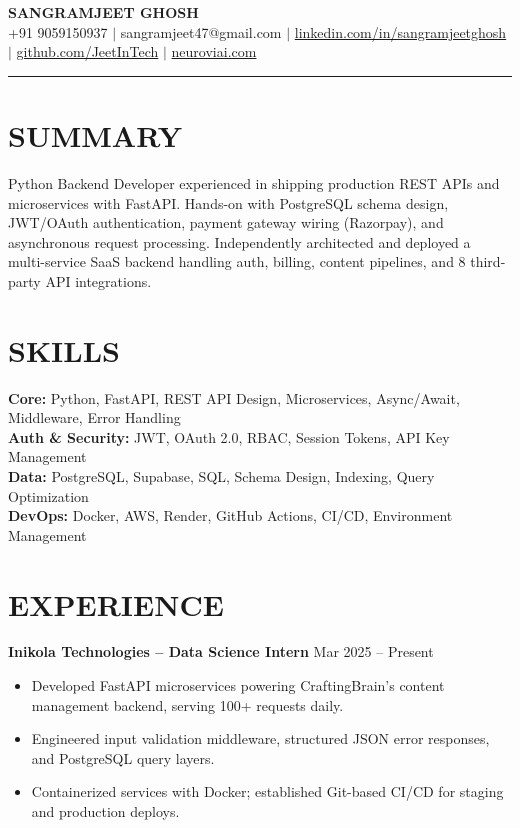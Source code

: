\documentclass[10pt]{article}
\begin{document}
\begin{center}
{\Large \textbf{SANGRAMJEET GHOSH}} \\[2pt]
{\small +91 9059150937 $|$ sangramjeet47@gmail.com $|$
\href{https://www.linkedin.com/in/sangramjeetghosh}{linkedin.com/in/sangramjeetghosh} $|$
\href{https://github.com/JeetInTech}{github.com/JeetInTech} $|$
\href{https://neuroviai.com}{neuroviai.com}}
\end{center}

\noindent\rule{\textwidth}{0.4pt}

\section*{SUMMARY}
Python Backend Developer experienced in shipping production REST APIs and microservices with FastAPI. Hands-on with PostgreSQL schema design, JWT/OAuth authentication, payment gateway wiring (Razorpay), and asynchronous request processing. Independently architected and deployed a multi-service SaaS backend handling auth, billing, content pipelines, and 8 third-party API integrations.

\section*{SKILLS}
\textbf{Core:} Python, FastAPI, REST API Design, Microservices, Async/Await, Middleware, Error Handling \\
\textbf{Auth \& Security:} JWT, OAuth 2.0, RBAC, Session Tokens, API Key Management \\
\textbf{Data:} PostgreSQL, Supabase, SQL, Schema Design, Indexing, Query Optimization \\
\textbf{DevOps:} Docker, AWS, Render, GitHub Actions, CI/CD, Environment Management

\section*{EXPERIENCE}
\textbf{Inikola Technologies -- Data Science Intern} \hfill Mar 2025 -- Present
\begin{itemize}
\item Developed FastAPI microservices powering CraftingBrain's content management backend, serving 100+ requests daily.
\item Engineered input validation middleware, structured JSON error responses, and PostgreSQL query layers.
\item Containerized services with Docker; established Git-based CI/CD for staging and production deploys.
\end{itemize}
\end{document}
